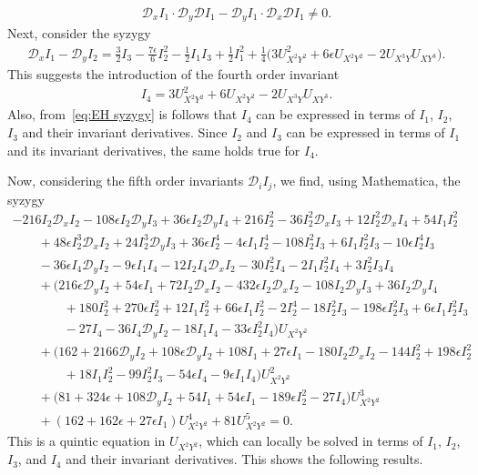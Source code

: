\documentclass[pdftex]{sigma}%
\numberwithin{equation}{section}
\newcommand{\D}{\mathcal{D}}
\begin{document}
\begin{gather*}
\D_xI_1\cdot \D_y\D I_1 - \D_yI_1\cdot \D_x\D I_1\neq 0.
\end{gather*}
Next, consider the syzygy
%
\begin{gather}\label{eq:EH syzygy}
\mathcal{D}_xI_1-\mathcal{D}_yI_2 = \frac{3}{2}I_3 - \frac{7\epsilon}{6}I_2^2 - \frac{1}{2}I_1I_3+\frac{1}{2}I_1^2+\frac{1}{4}\big(3U_{X^2Y^2}^2 + 6\epsilon U_{X^2Y^2}-2U_{X^3Y}U_{XY^3}\big).
\end{gather}
%
This suggests the introduction of the fourth order invariant
\begin{gather*}
I_4=3U_{X^2Y^2}^2+6U_{X^2Y^2} - 2U_{X^3Y}U_{XY^3}.
\end{gather*}
Also, from~\eqref{eq:EH syzygy} is follows that $I_4$ can be expressed in terms of $I_1$, $I_2$, $I_3$ and their invariant derivatives. Since $I_2$ and $I_3$ can be expressed in terms of $I_1$ and its invariant derivatives, the same holds true for $I_4$.

Now, considering the fifth order invariants $\D_i I_j$, we find, using {\sc Mathematica}, the syzygy
%
\begin{gather*}
-216 I_2 \D_xI_2 - 108\epsilon I_2\D_yI_3 + 36\epsilon I_2 \D_yI_4 + 216I_2^2 - 36I_2^2\D_xI_3 + 12I_2^2\D_xI_4 + 54 I_1I_2^2
\\ \qquad
{}+ 48\epsilon I_2^3\D_xI_2 + 24 I_2^3\D_yI_3 + 36\epsilon I_2^4 - 4\epsilon I_1I_2^4 - 108I_2^2I_3 + 6I_1I_2^2I_3-10\epsilon I_2^4I_3
\\ \qquad
{}-36\epsilon I_4\D_yI_2 - 9\epsilon I_1I_4 - 12I_2I_4\D_xI_2 - 30I_2^2I_4 - 2I_1I_2^2I_4 + 3I_2^2I_3I_4
\\ \qquad
{}+ \big(216\epsilon \D_yI_2+54\epsilon I_1+ 72I_2\D_xI_2
- 432\epsilon I_2\D_xI_2 - 108I_2\D_yI_3 + 36I_2\D_yI_4
\\ \qquad\qquad
{}+ 180I_2^2 + 270\epsilon I_2^2 + 12 I_1I_2^2+ 66\epsilon I_1I_2^2 - 2I_2^4 -18I_2^2I_3-198\epsilon I_2^2I_3+6\epsilon I_1I_2^2I_3
\\ \qquad\qquad
{}-27I_4 - 36I_4\D_yI_2 - 18I_1I_4 -33\epsilon I_2^2I_4\big)U_{X^2Y^2}
\\ \qquad
{}+ \big(162 + 2166 \D_yI_2 + 108\epsilon \D_yI_2 + 108I_1+27\epsilon I_1
-180I_2\D_xI_2-144I_2^2+198\epsilon I_2^2
\\ \qquad\qquad
{}+18I_1I_2^2 -99I_2^2I_3-54\epsilon I_4-9\epsilon I_1I_4\big)U_{X^2Y^2}^2
\\ \qquad
{}+ \big(81+324\epsilon +108\D_yI_2 + 54I_1+54\epsilon I_1 -189\epsilon I_2^2
- 27I_4\big)U_{X^2Y^2}^3
\\ \qquad
{}+ (162+162\epsilon+27\epsilon I_1)U_{X^2Y^2}^4 + 81U_{X^2Y^2}^5 = 0.
\end{gather*}
This is a quintic equation in $U_{X^2Y^2}$, which can locally be solved in terms of $I_1$, $I_2$, $I_3$, and $I_4$ and their invariant derivatives. This shows the following results.
\end{document}
